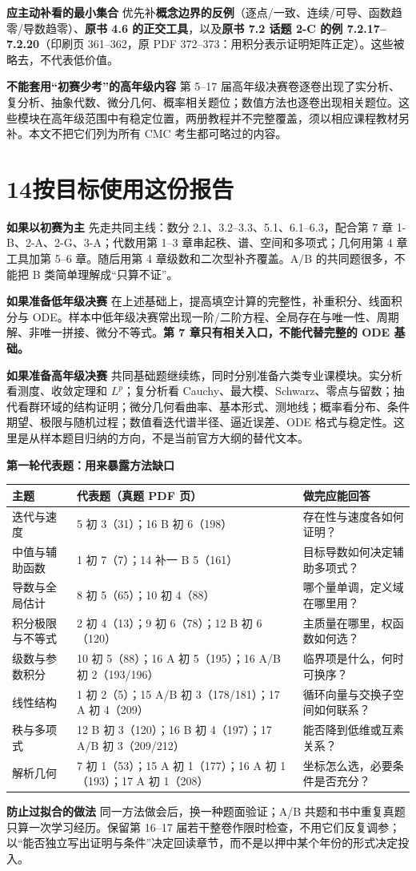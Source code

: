 \documentclass[UTF8,a4paper,11pt,fontset=windows]{ctexart}
\newcommand{\key}[1]{\textbf{\color{ink}#1}}
\newcommand{\para}[1]{\par\medskip\noindent\key{#1}\quad}
\newcommand{\topic}[1]{\section*{#1}\addcontentsline{toc}{section}{#1}}
\begin{document}
\para{应主动补看的最小集合}
优先补\textbf{概念边界的反例}（逐点/一致、连续/可导、函数趋零/导数趋零）、\textbf{原书 4.6 的正交工具}，以及\textbf{原书 7.2 话题 2-C 的例 7.2.17--7.2.20}（印刷页 361--362，原 PDF 372--373：用积分表示证明矩阵正定）。这些被略去，不代表低价值。

\para{不能套用“初赛少考”的高年级内容}
第 5--17 届高年级决赛卷逐卷出现了实分析、复分析、抽象代数、微分几何、概率相关题位；数值方法也逐卷出现相关题位。这些模块在高年级范围中有稳定位置，两册教程并不完整覆盖，须以相应课程教材另补。本文不把它们列为所有 CMC 考生都可略过的内容。

\clearpage
\topic{14\quad 按目标使用这份报告}
\para{如果以初赛为主}
先走共同主线：数分 2.1、3.2--3.3、5.1、6.1--6.3，配合第 7 章 1-B、2-A、2-G、3-A；代数用第 1--3 章串起秩、谱、空间和多项式；几何用第 4 章工具加第 5--6 章。随后用第 4 章级数和二次型补齐覆盖。A/B 的共同题很多，不能把 B 类简单理解成“只算不证”。

\para{如果准备低年级决赛}
在上述基础上，提高填空计算的完整性，补重积分、线面积分与 ODE。样本中低年级决赛常出现一阶/二阶方程、全局存在与唯一性、周期解、非唯一拼接、微分不等式。\textbf{第 7 章只有相关入口，不能代替完整的 ODE 基础。}

\para{如果准备高年级决赛}
共同基础题继续练，同时分别准备六类专业课模块。实分析看测度、收敛定理和 $L^p$；复分析看 Cauchy、最大模、Schwarz、零点与留数；抽代看群环域的结构证明；微分几何看曲率、基本形式、测地线；概率看分布、条件期望、极限与随机过程；数值看迭代谱半径、逼近误差、ODE 格式与稳定性。这里是从样本题目归纳的方向，不是当前官方大纲的替代文本。

\para{第一轮代表题：用来暴露方法缺口}
\par\noindent\begin{tabularx}{\linewidth}{P{2.8cm}YY}
\toprule
主题 & 代表题（真题 PDF 页） & 做完应能回答\\
\midrule
迭代与速度 & 5 初 3（31）；16 B 初 6（198） & 存在性与速度各如何证明？\\
中值与辅助函数 & 1 初 7（7）；14 补一 B 5（161） & 目标导数如何决定辅助多项式？\\
导数与全局估计 & 8 初 5（65）；10 初 4（88） & 哪个量单调，定义域在哪里用？\\
积分极限与不等式 & 2 初 4（13）；9 初 6（78）；12 B 初 6（120） & 主质量在哪里，权函数如何选？\\
级数与参数积分 & 10 初 5（88）；16 A 初 5（195）；16 A/B 初 2（193/196） & 临界项是什么，何时可换序？\\
线性结构 & 1 初 2（5）；15 A/B 初 3（178/181）；17 A 初 4（209） & 循环向量与交换子空间如何联系？\\
秩与多项式 & 12 B 初 3（120）；16 B 初 4（197）；17 A/B 初 3（209/212） & 能否降到低维或互素关系？\\
解析几何 & 7 初 1（53）；15 A 初 1（177）；16 A 初 1（193）；17 A 初 1（208） & 坐标怎么选，必要条件是否充分？\\
\bottomrule
\end{tabularx}

\para{防止过拟合的做法}
同一方法做会后，换一种题面验证；A/B 共题和书中重复真题只算一次学习经历。保留第 16--17 届若干整卷作限时检查，不用它们反复调参；以“能否独立写出证明与条件”决定回读章节，而不是以押中某个年份的形式决定投入。
\end{document}
